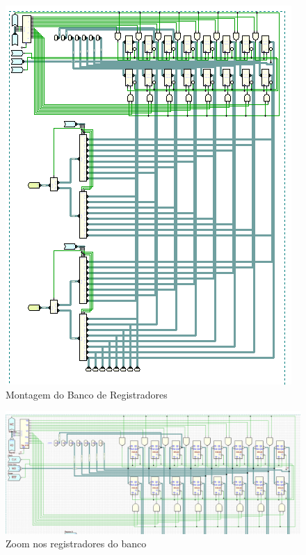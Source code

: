 \documentclass[12pt]{article}
\begin{document}
\begin{figure}[H]
    \centering
    \includegraphics[width=.9\textwidth]{Projeto/images/circuit__register_file.png}
    \caption{Montagem do Banco de Registradores}\label{fig:circuit__register_file.png}
\end{figure}

\begin{figure}[H]
    \centering
    \includegraphics[width=.9\textwidth]{Projeto/images/circuit__register_file_1.png}
    \caption{Zoom nos registradores do banco}\label{fig:circuit__register_file_1.png}
\end{figure}
\end{document}
